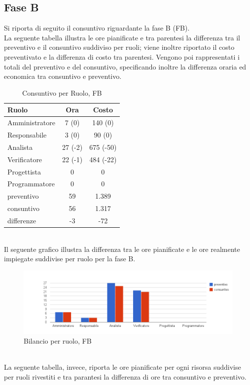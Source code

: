 \subsection{Fase B}
\label{consuntivoAnalisiIncr}
	Si riporta di seguito il consuntivo riguardante la fase B (FB).
	\\ La seguente tabella illustra le ore pianificate e tra parentesi la differenza tra il preventivo e il consuntivo suddiviso per ruoli; viene inoltre riportato il costo preventivato e la differenza di costo tra parentesi. Vengono poi rappresentati i totali del preventivo e del consuntivo, specificando inoltre la differenza oraria ed economica tra consuntivo e preventivo.
	\begin{table}[!h]
		\centering
		\begin{tabular}{|l|c|c|}
			\hline
			Ruolo & Ora & Costo\\
			\hline
			Amministratore & 7 (0) & 140 (0)\\
			Responsabile & 3 (0) & 90 (0)\\
			Analista & 27 (-2) & 675 (-50)\\
			Verificatore & 22 (-1) & 484 (-22)\\
			Progettista & 0 & 0\\
			Programmatore & 0 & 0\\	
			\hline
			preventivo & 59 & 1.389\\
			consuntivo & 56& 1.317 \\
			differenze & -3& -72 \\
			\hline			
		\end{tabular}
		\caption{Consuntivo per Ruolo, FB}
	\end{table}
		\\Il seguente grafico illustra la differenza tra le ore pianificate e le ore realmente impiegate suddivise per ruolo per la fase B.
\begin{figure}[h]
	\centering
	\includegraphics[width=1.1\textwidth] {./content/Immagini/consAI.png}
	\caption{Bilancio per ruolo, FB}
	\label{bilAI}
\end{figure}	 
		\\La seguente tabella, invece, riporta le ore pianificate per ogni risorsa suddivise per ruoli rivestiti e tra parantesi la differenza di ore tra consuntivo e preventivo.	
